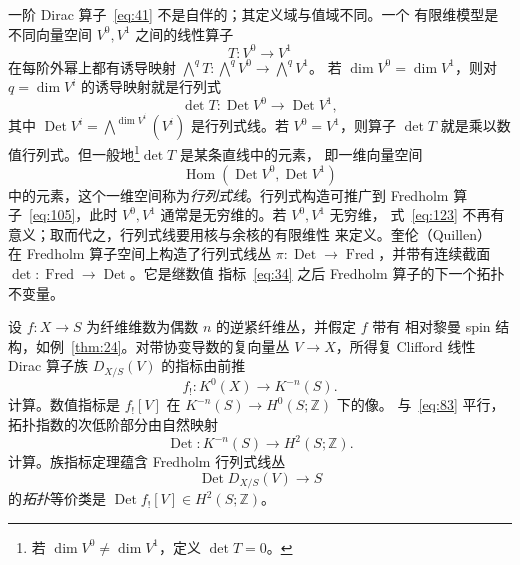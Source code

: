 \documentclass[11pt]{amsart}
\theoremstyle{definition}
\theoremstyle{remark}
\theoremstyle{plain}
\numberwithin{equation}{section}
\renewcommand{\:}{\colon}
\DeclareMathOperator{\Hom}{Hom}
\newcommand{\ZZ}{{\mathbb Z}}
\DeclareMathOperator{\coker}{coker}
\DeclareMathOperator{\Det}{Det}
\DeclareMathOperator{\Fred}{Fred}
\begin{document}
一阶 Dirac 算子~\eqref{eq:41} 不是自伴的；其定义域与值域不同。一个
有限维模型是不同向量空间 $V^0,V^1$ 之间的线性算子
  \begin{equation}\label{eq:105}
     T\:V^0\longrightarrow V^1 
  \end{equation}
在每阶外幂上都有诱导映射
${\textstyle\bigwedge} ^qT\:{\textstyle\bigwedge} ^qV^0\to {\textstyle\bigwedge} ^qV^1$。
若 $\dim V^0=\dim V^1$，则对 $q=\dim V^i$ 的诱导映射就是行列式
  \begin{equation}\label{eq:106}
     \det T\:\Det V^0\longrightarrow \Det V^1, 
  \end{equation}
其中 $\Det V^i = {\textstyle\bigwedge} ^{\dim V^i}(V^i)$ 是行列式线。若
$V^0=V^1$，则算子 $\det T$ 就是乘以数值行列式。但一般地\footnote{若
$\dim V^0\neq \dim V^1$，定义 $\det T=0$。}$\det T$ 是某条直线中的元素，
即一维向量空间
  \begin{equation}\label{eq:123}
     \Hom(\Det V^0,\Det V^1)
  \end{equation}
中的元素，这个一维空间称为\emph{行列式线}。行列式构造可推广到 Fredholm
算子~\eqref{eq:105}，此时 $V^0,V^1$ 通常是无穷维的。若 $V^0,V^1$ 无穷维，
式~\eqref{eq:123} 不再有意义；取而代之，行列式线要用核与余核的有限维性
来定义。奎伦（Quillen）~\cite{Q} 在 Fredholm 算子空间上构造了行列式线丛
$\pi \:\Det\to \Fred$，并带有连续截面 $\det\:\Fred\to \Det$。它是继数值
指标~\eqref{eq:34} 之后 Fredholm 算子的下一个拓扑不变量。

设 $f\:X\to S$ 为纤维维数为偶数 $n$ 的逆紧纤维丛，并假定 $f$ 带有
相对黎曼 spin 结构，如例~\ref{thm:24}。对带协变导数的复向量丛
$V\to X$，所得复 Clifford 线性 Dirac 算子族 $D_{X/S}(V)$ 的指标由前推
  \begin{equation}\label{eq:107}
     f_!\:K^0(X)\longrightarrow K^{-n}(S). 
  \end{equation}
计算。数值指标是 $f_![V]$ 在 $K^{-n}(S)\to H^0(S;\ZZ)$ 下的像。
与~\eqref{eq:83} 平行，拓扑指数的次低阶部分由自然映射
  \begin{equation}\label{eq:108}
     \Det\:K^{-n}(S)\longrightarrow H^2(S;\ZZ). 
  \end{equation}
计算。族指标定理蕴含 Fredholm 行列式线丛
  \begin{equation}\label{eq:109}
     \Det D_{X/S}(V)\longrightarrow S 
  \end{equation}
的\emph{拓扑}等价类是 $\Det f_![V]\in H^2(S;\ZZ)$。
\end{document}
